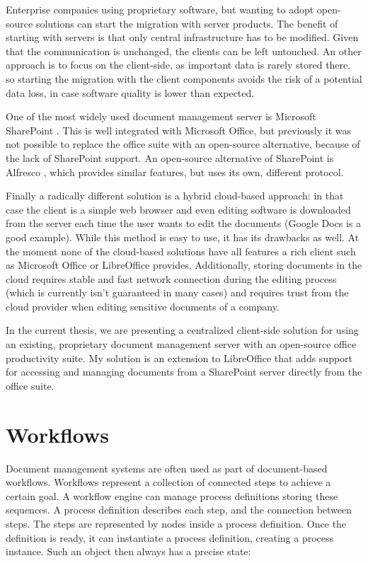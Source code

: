 Enterprise companies using proprietary software, but wanting to adopt
open-source solutions can start the migration with server products. The benefit
of starting with servers is that only central infrastructure has to be
modified. Given that the communication is unchanged, the clients can be left
untouched. An other approach is to focus on the client-side, as important data
is rarely stored there, so starting the migration with the client components
avoids the risk of a potential data loss, in case software quality is lower
than expected.

One of the most widely used document management server is Microsoft
SharePoint \cite{sharepoint}. This is well integrated with Microsoft Office, but
previously it was not possible to replace the office suite with an open-source
alternative, because of the lack of SharePoint support. An open-source
alternative of SharePoint is Alfresco \cite{alfresco}, which provides similar
features, but uses its own, different protocol.

Finally a radically different solution is a hybrid cloud-based approach: in that case
the client is a simple web browser and even editing software is downloaded from
the server each time the user wants to edit the documents (Google
Docs \cite{google-docs} is a good example). While this method is easy to use, it
has its drawbacks as well. At the moment none of the cloud-based solutions have
all features a rich client such as Microsoft Office or LibreOffice provides.
Additionally, storing documents in the cloud requires stable and fast network
connection during the editing process (which is currently isn't guaranteed in many
cases) and requires trust from the cloud provider when editing sensitive
documents of a company.

In the current thesis, we are presenting a centralized client-side solution for
using an existing, proprietary document management server with an open-source
office productivity suite. My solution is an extension to LibreOffice that adds
support for accessing and managing documents from a SharePoint server directly
from the office suite.

\section{Workflows}

Document management systems are often used as part of document-based workflows.
Workflows represent a collection of connected steps to achieve a certain goal.
A workflow engine can manage process definitions storing these sequences. A
process definition describes each step, and the connection between steps. The
steps are represented by nodes inside a process definition. Once the definition
is ready, it can instantiate a process definition, creating a process instance.
Such an object then always has a precise state:

